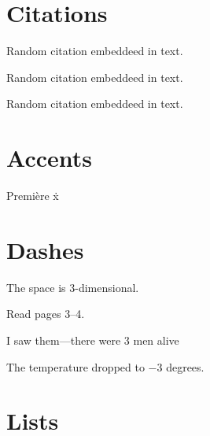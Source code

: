 \documentclass[12pt,letterpaper,titlepage]{report}
\begin{document}
\section{Citations}


Random citation \autocite{nguyen_widrow_1990} embeddeed in text.

Random citation \autocite{DUMMY:1} embeddeed in text.

Random citation \autocite{nguyen_widrow_1990} embeddeed in text.

\section{Accents}

Premi\`ere	\.x

\section{Dashes}

The space is 3-dimensional.

Read pages 3--4.

I saw them---there were 3 men alive

The temperature dropped to $-$3 degrees.

\section{Lists}
\end{document}
